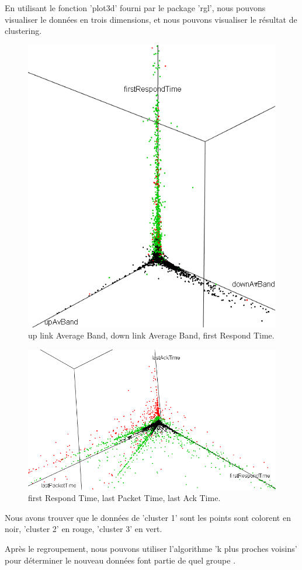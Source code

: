 En utilisant le fonction 'plot3d' fourni par le package 'rgl', nous pouvons visualiser le données en trois dimensions, et nous pouvons visualiser le résultat de clustering.


\begin{figure}[H]
\centering
\includegraphics[width=0.6\linewidth]{images/kmeqn}
\caption{up link Average Band, down link Average Band, first Respond Time.}
\label{fig:kmeqn}
\end{figure}
\begin{figure}[H]
\centering
\includegraphics[width=0.8\linewidth]{images/3delai}
\caption{first Respond Time, last Packet Time, last Ack Time.}
\label{fig:3delai}
\end{figure}

Nous avons trouver que le données de 'cluster 1' sont les points sont colorent en noir, 'cluster 2' en rouge, 'cluster 3' en vert. 

Après le regroupement, nous pouvons utiliser l'algorithme 'k plus proches voisins' pour déterminer le nouveau données font partie de quel groupe .

